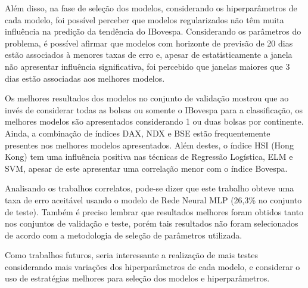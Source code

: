 \documentclass[12pt,a4paper,utf8]{ppgsi}
\begin{document}
    Além disso, na fase de seleção dos modelos, considerando os hiperparâmetros de cada modelo, foi possível perceber que modelos regularizados não têm muita influência na predição da tendência do IBovespa. Considerando os parâmetros do problema, é possível afirmar que modelos com horizonte de previsão de 20 dias estão associados à menores taxas de erro e, apesar de estatisticamente a janela não apresentar influência significativa, foi percebido que janelas maiores que 3 dias estão associadas aos melhores modelos.

    Os melhores resultados dos modelos no conjunto de validação mostrou que ao invés de considerar todas as bolsas ou somente o IBovespa para a classificação, os melhores modelos são apresentados considerando 1 ou duas bolsas por continente. Ainda, a combinação de índices DAX, NDX e BSE estão frequentemente presentes nos melhores modelos apresentados. Além destes, o índice HSI (Hong Kong) tem uma influência positiva nas técnicas de Regressão Logística, ELM e SVM, apesar de este apresentar uma correlação menor com o índice Bovespa.

    Analisando os trabalhos correlatos, pode-se dizer que este trabalho obteve uma taxa de erro aceitável usando o modelo de Rede Neural MLP (26,3\% no conjunto de teste). Também é preciso lembrar que resultados melhores foram obtidos tanto nos conjuntos de validação e teste, porém tais resultados não foram selecionados de acordo com a metodologia de seleção de parâmetros utilizada.

    Como trabalhos futuros, seria interessante a realização de mais testes considerando mais variações dos hiperparâmetros de cada modelo, e considerar o uso de estratégias melhores para seleção dos modelos e hiperparâmetros.




%
%
\end{document}
